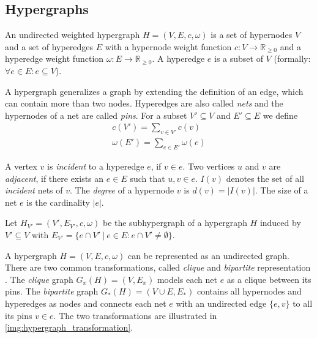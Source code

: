 \subsection{Hypergraphs}
\label{sec:hypergraph}

\begin{definition}
An undirected weighted hypergraph $H = (V,E,c,\omega)$ is a set of hypernodes $V$ 
and a set of hyperedges $E$ with a hypernode weight function 
$c: V \rightarrow \mathbb{R}_{\ge 0}$ and a hyperedge weight 
function $\omega: E \rightarrow \mathbb{R}_{\ge 0}$. A hyperedge $e$ 
is a subset of $V$ (formally: $\forall e \in E: e \subseteq V$).
\label{def:hypergraph}
\end{definition}

A hypergraph generalizes a graph by extending the definition of an edge, which 
can contain more than two nodes. Hyperedges are also called \emph{nets} and the hypernodes
of a net are called \emph{pins}. For a subset $V' \subseteq V$ and $E' \subseteq E$ we
define
\begin{align*}
c(V') = \sum_{v \in V'} c(v) \\
\omega(E') = \sum_{e \in E'} \omega(e)
\end{align*}

A vertex $v$ is \emph{incident} to a hyperedge $e$, if $v \in e$.
Two vertices $u$ and $v$ are \emph{adjacent}, if there exists an 
$e \in E$ such that $u,v \in e$. $I(v)$ denotes the set of all 
\emph{incident} nets of $v$. The \emph{degree} of a hypernode 
$v$ is $d(v) = |I(v)|$. The size of a net $e$ is the cardinality $|e|$.

\begin{definition}
Let $H_{V'} = (V',E_{V'},c,\omega)$ be the subhypergraph of a hypergraph $H$
induced by $V' \subseteq V$ with $E_{V'} = \{e \cap V'\ |\ e \in E: e 
\cap V' \neq \emptyset\}$.
\label{def:subhypergraph}
\end{definition}

A hypergraph $H = (V,E,c,\omega)$ can be represented as an undirected graph. 
There are two common transformations, called \emph{clique} and \emph{bipartite} 
representation \cite{HuMoerder85}. The \emph{clique} graph $G_x(H) = (V,E_x)$ models
each net $e$ as a clique between its pins. The \emph{bipartite} graph $G_*(H) = 
(V \cup E, E_*)$ contains all hypernodes and hyperedges as nodes and connects each
net $e$ with an undirected edge $\{e,v\}$ to all its pins $v \in e$. The two transformations
are illustrated in \autoref{img:hypergraph_transformation}.

